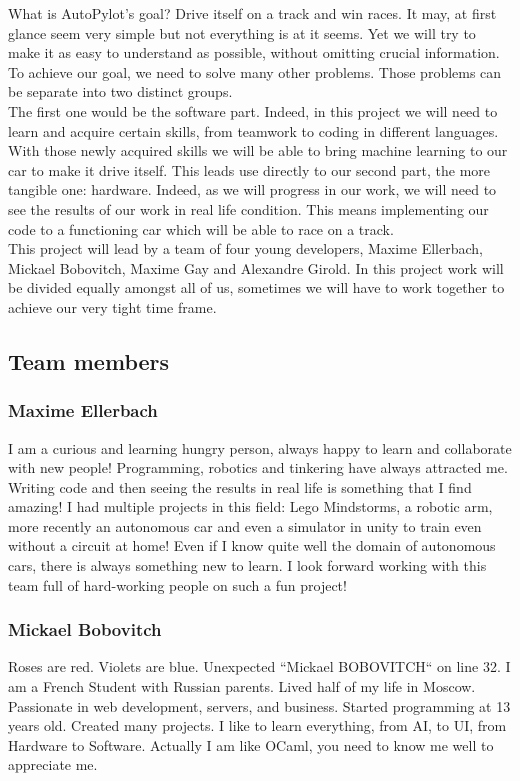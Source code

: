 \documentclass[12pt]{article}
\begin{document}
What is AutoPylot's goal? 
Drive itself on a track and win races. It may, at first glance seem very simple but not everything is at it seems. Yet we will try to make it as easy to understand as possible, without omitting crucial information. To achieve our goal, we need to solve many other problems. Those problems can be separate into two distinct groups. \\

The first one would be the software part. Indeed, in this project we will need to learn and acquire certain skills, from teamwork to coding in different languages. With those newly acquired skills we will be able to bring machine learning to our car to make it drive itself. This leads use directly to our second part, the more tangible one: hardware. Indeed, as we will progress in our work, we will need to see the results of our work in real life condition. This means implementing our code to a functioning car which will be able to race on a track. \\

This project will lead by a team of four young developers, Maxime Ellerbach, Mickael Bobovitch, Maxime Gay and Alexandre Girold. In this project work will be divided equally amongst all of us, sometimes we will have to work together to achieve our very tight time frame. 

\subsection{Team members}

\subsubsection{Maxime Ellerbach}
I am a curious and learning hungry person, always happy to learn and collaborate with new people! Programming, robotics and tinkering have always attracted me. Writing code and then seeing the results in real life is something that I find amazing! I had multiple projects in this field: Lego Mindstorms, a robotic arm, more recently an autonomous car and even a simulator in unity to train even without a circuit at home! Even if I know quite well the domain of autonomous cars, there is always something new to learn. I look forward working with this team full of hard-working people on such a fun project!

\subsubsection{Mickael Bobovitch}
Roses are red. Violets are blue. Unexpected “Mickael BOBOVITCH“ on line 32. I am a French Student with Russian parents. Lived half of my life in Moscow. Passionate in web development, servers, and business. Started programming at 13 years old. Created many projects. I like to learn everything, from AI, to UI, from Hardware to Software. Actually I am like OCaml, you need to know me well to appreciate me.
\end{document}
